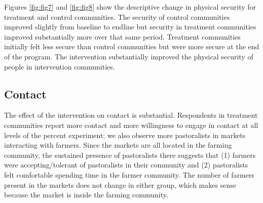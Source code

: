 \documentclass[11pt]{article}
\begin{document}
Figures \ref{fig:fig7} and \ref{fig:fig8} show the descriptive change in
physical security for treatment and control communities. The security of
control communities improved slightly from baseline to endline but
security in treatment communities improved substantially more over that
same period. Treatment communities initially felt less secure than
control communities but were more secure at the end of the program. The
intervention substantially improved the physical security of people in
intervention communities.

\hypertarget{contact}{%
\subsection{Contact}\label{contact}}

The effect of the intervention on contact is substantial. Respondents in
treatment communities report more contact and more willingness to engage
in contact at all levels of the percent experiment; we also observe more
pastoralists in markets interacting with farmers. Since the markets are
all located in the farming community, the sustained presence of
pastoralists there suggests that (1) farmers were accepting/tolerant of
pastoralists in their community and (2) pastoralists felt comfortable
spending time in the farmer community. The number of farmers present in
the markets does not change in either group, which makes sense because
the market is inside the farming community.
\end{document}
